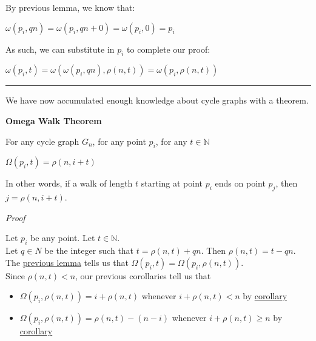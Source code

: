 \documentclass[a4paper,12pt]{article}
\begin{document}
\noindent By previous lemma, we know that:
\begin{center}
$\omega(p_i, qn) = \omega(p_i, qn + 0) = \omega(p_i, 0) = p_i$
\end{center}

\noindent As such, we can substitute in $p_i$ to complete our proof:
\begin{center}
$\omega(p_i, t) = \omega(\omega(p_i, qn), \rho(n, t)) = \omega(p_i, \rho(n, t))$
\end{center}

\begin{center}
\noindent\rule{8cm}{0.4pt}
\end{center}


\noindent We have now accumulated enough knowledge about cycle graphs with a theorem.\\



\label{theorem:omega_walk_theorem}
\hypertarget{theorem:omega_walk_theorem}{}
\begin{tcolorbox}
\textbf{Omega Walk Theorem}

\noindent For any cycle graph $G_n$, for any point $p_i$, for any $t \in \mathbb{N}$
\begin{center}
$\Omega(p_i, t) = \rho(n, i + t)$
\end{center}

\noindent In other words, if a walk of length $t$ starting at point $p_i$ ends on point $p_j$, then $j = \rho(n, i + t)$.
\end{tcolorbox}


\noindent
\textit{Proof}

\noindent Let $p_i$ be any point. Let $t \in \mathbb{N}$.\\

\noindent Let $q \in N$ be the integer such that $t = \rho(n, t) + qn$. Then $\rho(n, t) = t - qn$.\\

\noindent The \hyperlink{lemma:omega_rho_reduction}{previous lemma} tells us that $\Omega(p_i, t) = \Omega(p_i, \rho(n, t))$.\\

\noindent Since $\rho(n, t) < n$, our previous corollaries tell us that
\begin{itemize}
\item $\Omega(p_i, \rho(n, t)) = i + \rho(n, t)$ whenever $i + \rho(n, t) < n$ by \hyperlink{corollary:Omega_result_1}{corollary}
\item $\Omega(p_i, \rho(n, t)) = \rho(n, t) - (n - i)$ whenever $i + \rho(n, t) \geq n$ by \hyperlink{corollary:Omega_result_2}{corollary}
\end{itemize}
\end{document}
